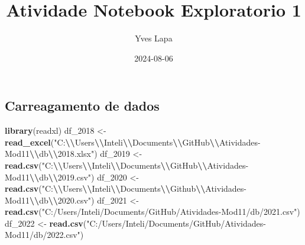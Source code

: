 \documentclass[
]{article}
\title{Atividade Notebook Exploratorio 1}
\author{Yves Lapa}
\date{2024-08-06}
\newenvironment{Shaded}{\begin{snugshade}}{\end{snugshade}}
\newcommand{\FunctionTok}[1]{\textcolor[rgb]{0.13,0.29,0.53}{\textbf{#1}}}
\newcommand{\NormalTok}[1]{#1}
\newcommand{\OtherTok}[1]{\textcolor[rgb]{0.56,0.35,0.01}{#1}}
\newcommand{\SpecialCharTok}[1]{\textcolor[rgb]{0.81,0.36,0.00}{\textbf{#1}}}
\newcommand{\StringTok}[1]{\textcolor[rgb]{0.31,0.60,0.02}{#1}}
\begin{document}
\maketitle

\subsection{Carreagamento de dados}\label{carreagamento-de-dados}

\begin{Shaded}
\begin{Highlighting}[]
\FunctionTok{library}\NormalTok{(readxl)}
\NormalTok{df\_2018 }\OtherTok{\textless{}{-}} \FunctionTok{read\_excel}\NormalTok{(}\StringTok{"C:}\SpecialCharTok{\textbackslash{}\textbackslash{}}\StringTok{Users}\SpecialCharTok{\textbackslash{}\textbackslash{}}\StringTok{Inteli}\SpecialCharTok{\textbackslash{}\textbackslash{}}\StringTok{Documents}\SpecialCharTok{\textbackslash{}\textbackslash{}}\StringTok{GitHub}\SpecialCharTok{\textbackslash{}\textbackslash{}}\StringTok{Atividades{-}Mod11}\SpecialCharTok{\textbackslash{}\textbackslash{}}\StringTok{db}\SpecialCharTok{\textbackslash{}\textbackslash{}}\StringTok{2018.xlsx"}\NormalTok{)}
\NormalTok{df\_2019 }\OtherTok{\textless{}{-}} \FunctionTok{read.csv}\NormalTok{(}\StringTok{"C:}\SpecialCharTok{\textbackslash{}\textbackslash{}}\StringTok{Users}\SpecialCharTok{\textbackslash{}\textbackslash{}}\StringTok{Inteli}\SpecialCharTok{\textbackslash{}\textbackslash{}}\StringTok{Documents}\SpecialCharTok{\textbackslash{}\textbackslash{}}\StringTok{GitHub}\SpecialCharTok{\textbackslash{}\textbackslash{}}\StringTok{Atividades{-}Mod11}\SpecialCharTok{\textbackslash{}\textbackslash{}}\StringTok{db}\SpecialCharTok{\textbackslash{}\textbackslash{}}\StringTok{2019.csv"}\NormalTok{)}
\NormalTok{df\_2020 }\OtherTok{\textless{}{-}} \FunctionTok{read.csv}\NormalTok{(}\StringTok{"C:}\SpecialCharTok{\textbackslash{}\textbackslash{}}\StringTok{Users}\SpecialCharTok{\textbackslash{}\textbackslash{}}\StringTok{Inteli}\SpecialCharTok{\textbackslash{}\textbackslash{}}\StringTok{Documents}\SpecialCharTok{\textbackslash{}\textbackslash{}}\StringTok{Github}\SpecialCharTok{\textbackslash{}\textbackslash{}}\StringTok{Atividades{-}Mod11}\SpecialCharTok{\textbackslash{}\textbackslash{}}\StringTok{db}\SpecialCharTok{\textbackslash{}\textbackslash{}}\StringTok{2020.csv"}\NormalTok{)}
\NormalTok{df\_2021 }\OtherTok{\textless{}{-}} \FunctionTok{read.csv}\NormalTok{(}\StringTok{"C:/Users/Inteli/Documents/GitHub/Atividades{-}Mod11/db/2021.csv"}\NormalTok{)}
\NormalTok{df\_2022 }\OtherTok{\textless{}{-}} \FunctionTok{read.csv}\NormalTok{(}\StringTok{"C:/Users/Inteli/Documents/GitHub/Atividades{-}Mod11/db/2022.csv"}\NormalTok{)}

\end{Highlighting}
\end{Shaded}
\end{document}
